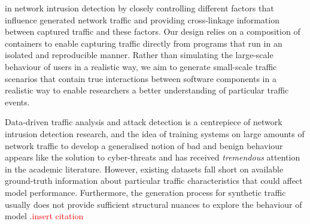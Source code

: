\documentclass[runningheads]{llncs}
\begin{document}
in network intrusion detection by closely controlling different factors that influence generated network traffic and providing cross-linkage information between captured traffic and these factors. Our design relies on a composition of containers to enable capturing traffic directly from programs that run in an isolated and reproducible manner. Rather than simulating the large-scale behaviour of users in a realistic way, we aim to generate small-scale traffic scenarios that contain true interactions between software components in a realistic way to enable researchers a better understanding of particular traffic events. 



Data-driven traffic analysis and attack detection is a centrepiece of network intrusion detection research, and the idea of training systems on large amounts of network traffic to develop a generalised notion of bad and benign behaviour appears  like the solution to cyber-threats and has received \textit{tremendous} attention in the academic literature. However, existing datasets fall short on available ground-truth information about particular traffic characteristics that could affect model performance. Furthermore, the generation process for synthetic traffic usually does not provide sufficient structural nuances to explore the behaviour of model .\textcolor{red}{insert citation}





\end{document}
